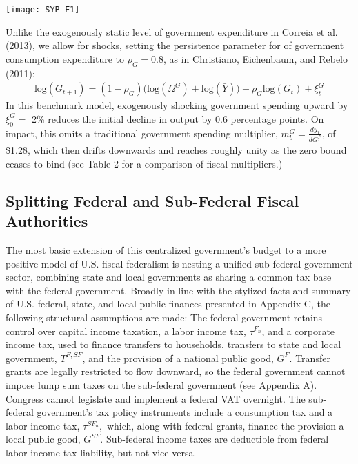 \documentclass[12pt,letterpaper]{article}
\begin{document}
\begin{center}
\texttt{[image: SYP\_F1]}
\end{center}

Unlike the exogenously static level of government expenditure in Correia et al. (2013), we allow for shocks, setting the persistence parameter for of government consumption expenditure to $ \rho_G  = 0.8$, as in Christiano, Eichenbaum, and Rebelo (2011):
\begin{align}
\text{log}(G_{t+1}) = (1 - \rho_G)\big(\text{log}(\Omega^G)+\text{log}(\bar{Y})\big) + \rho_G \text{log}(G_t) + \xi_t^G
\end{align}
In this benchmark model, exogenously shocking government spending upward by $\xi_0^G = $ 2\% reduces the initial decline in output by 0.6 percentage points. On impact, this omits a traditional government spending multiplier, $m^{G}_b = \frac{dy_1}{dG^F_1} $, of \$1.28, which then drifts downwards and reaches roughly unity as the zero bound ceases to bind (see Table 2 for a comparison of fiscal multipliers.) 

\subsection{Splitting Federal and Sub-Federal Fiscal Authorities}
The most basic extension of this centralized  government's budget to a more positive model of U.S. fiscal federalism is nesting a unified sub-federal government sector, combining state and local governments as sharing a common tax base with the federal government. Broadly in line with the stylized facts and summary of U.S. federal, state, and local public finances presented in Appendix C, the following structural assumptions are made: The federal government retains control over capital income taxation, a labor income tax, $\tau^{F_n}$, and a corporate income tax, used to finance transfers to households, transfers to state and local government, $T^{F,SF}$, and the provision of a national public good, $G^F$. Transfer grants are legally restricted to flow downward, so the federal government cannot impose lump sum taxes on the sub-federal government (see Appendix A). Congress cannot legislate and implement a federal VAT overnight. The sub-federal government's tax policy instruments include a consumption tax and a labor income tax, $\tau^{SF_n},$ which, along with federal grants, finance the provision a local public good, $G^{SF}$. Sub-federal income taxes are deductible from federal labor income tax liability, but not vice versa.
\end{document}
